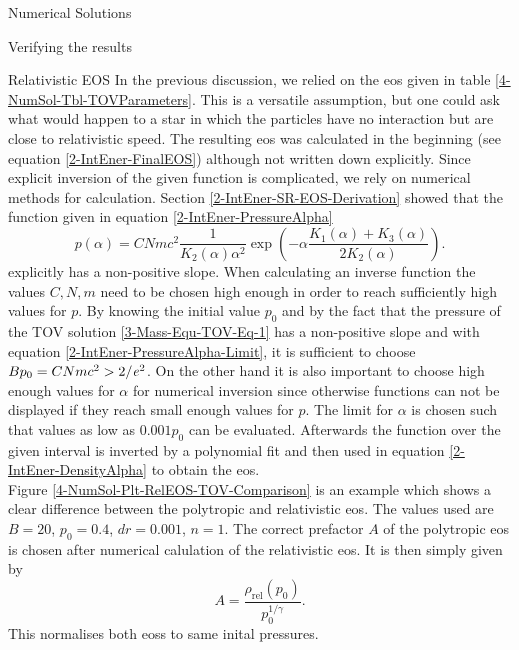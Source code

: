 \begin{section}{Numerical Solutions}
\begin{subsection}{Verifying the results}
% 
\end{subsection}
%
%
\begin{subsection}{Relativistic EOS}
\label{4-NumSol-Sec-RelEOS}
In the previous discussion, we relied on the \ac{eos} given in table \ref{4-NumSol-Tbl-TOVParameters}.
This is a versatile assumption, but one could ask what would happen to a star in which the particles have no interaction but are close to relativistic speed.
The resulting \ac{eos} was calculated in the beginning (see equation \eqref{2-IntEner-FinalEOS}) although not written down explicitly.
Since explicit inversion of the given function is complicated, we rely on numerical methods for calculation.
Section \ref{2-IntEner-SR-EOS-Derivation} showed that the function given in equation \eqref{2-IntEner-PressureAlpha}
\begin{equation}
	p(\alpha) = CNmc^2\frac{1}{K_2(\alpha)\alpha^2}\exp\left(-\alpha\frac{K_1(\alpha)+K_3(\alpha)}{2K_2(\alpha)}\right).
\end{equation}
explicitly has a non-positive slope. 
When calculating an inverse function the values $C,N,m$ need to be chosen high enough in order to reach sufficiently high values for $p$.
By knowing the initial value $p_0$ and by the fact that the pressure of the \ac{TOV} solution \eqref{3-Mass-Equ-TOV-Eq-1} has a non-positive slope and with equation \eqref{2-IntEner-PressureAlpha-Limit}, it is sufficient to choose $Bp_0=CNmc^2>2/\mathit{e}^2$.
On the other hand it is also important to choose high enough values for $\alpha$ for numerical inversion since otherwise functions can not be displayed if they reach small enough values for $p$.
The limit for $\alpha$ is chosen such that values as low as $0.001p_0$ can be evaluated.
Afterwards the function over the given interval is inverted by a polynomial fit and then used in equation \eqref{2-IntEner-DensityAlpha} to obtain the \ac{eos}.\\
Figure \ref{4-NumSol-Plt-RelEOS-TOV-Comparison} is an example which shows a clear difference between the polytropic and relativistic \ac{eos}.
The values used are $B=20$, $p_0=0.4$, $dr=0.001$, $n=1$.
The correct prefactor $A$ of the polytropic \ac{eos} is chosen after numerical calulation of the relativistic \ac{eos}.
It is then simply given by 
\begin{equation}
	A=\frac{\rho_\mathrm{rel}(p_0)}{p_0^{1/\gamma}}.
\end{equation}
This normalises both \acp{eos} to same inital pressures.
\begin{figure}

\end{figure}
\end{subsection}
\end{section}
